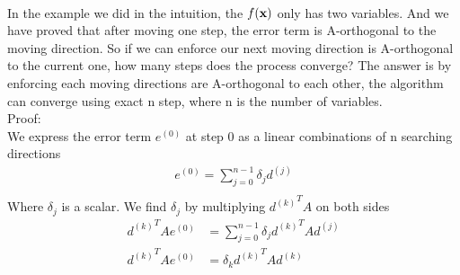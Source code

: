 \documentclass[a4paper]{article}
\begin{document}
\\
In the example we did in the intuition, the $f({\bf x})$ only has two variables. And we have proved that after moving one step, the error term is A-orthogonal to the moving direction. So if we can enforce our next moving direction is A-orthogonal to the current one, how many steps does the process converge?  The answer is by enforcing each moving directions are A-orthogonal to each other, the algorithm can converge using exact n step, where n is the number of variables.\\
\noindent Proof:\\
We express the error term $e^{(0)}$ at step 0 as a linear combinations of n searching directions\\
\begin{align*}
	e^{(0)} = \sum_{j=0} ^{n-1} \delta_j d^{(j)}\\
\end{align*}
Where $\delta_j$ is a scalar. We find $\delta_j$ by multiplying ${d^{(k)}}^T A$ on both sides
\begin{align*}
	{d^{(k)}}^T A e^{(0)} & = \sum_{j=0} ^{n-1} \delta_j {d^{(k)}}^T A d^{(j)} \\
	{d^{(k)}}^T A e^{(0)} & = \delta_k {d^{(k)}}^T A d^{(k)} \\
\end{align*}
\end{document}
